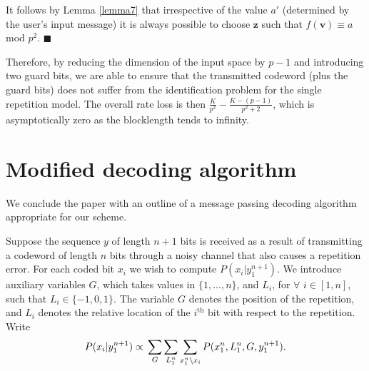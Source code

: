 It follows by Lemma \ref{lemma7} that irrespective of the value
$a'$ (determined by the user's input message) it is always
possible to choose $\mathbf{z}$ such that $f(\mathbf{v}) \equiv a$
mod $p^2$. \hfill$\blacksquare$

Therefore, by reducing the dimension of the input space by $p-1$
and introducing two guard bits, we are able to ensure that the
transmitted codeword (plus the guard bits) does not suffer from
the identification problem for the single repetition model. The
overall rate loss is then $\frac{K}{p^2}-\frac{K-(p-1)}{p^2+2}$,
which is asymptotically
zero as the blocklength tends to infinity. %




\section{Modified decoding algorithm}\label{dec}

We conclude the paper with an outline of a message passing
decoding algorithm appropriate for our scheme.

Suppose the sequence $y$ of length $n+1$ bits is received as a
result of transmitting a codeword of length $n$ bits through a
noisy channel that also causes a repetition error. For each coded
bit $x_i$ we wish to compute $P(x_i| y_1^{n+1})$. We introduce
auxiliary variables $G$, which takes values in $\{1,...,n\}$, and
$L_i$, for $\forall$ $i \in [1,n]$, such that $L_i \in
\{-1,0,1\}$. The variable $G$ denotes the position of the
repetition, and $L_i$ denotes the relative location of the
$i^{\text{th}}$ bit with respect to the repetition.
Write \begin{equation}\vspace{-0.1in}\label{marg}P(x_i| y_1^{n+1}) \propto\\
\sum_G \sum_{L_1^n} \sum_{x_1^n \backslash x_i}
P(x_1^n,L_1^n,G,y_1^{n+1}).\end{equation}

